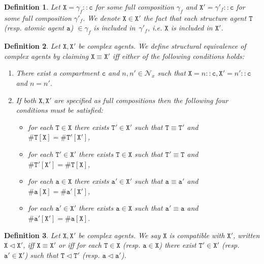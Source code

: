 \documentclass[12pt]{article}
\newtheorem{mydef}{Definition}
\begin{document}
\begin{mydef}
Let $\mathtt{X}=\gamma_f::\mathtt{c}$ for some full composition $\gamma_f$ and $\mathtt{X}'=\gamma'_f::\mathtt{c}$ for some full composition $\gamma'_f$. We denote $\mathtt{X} \in \mathtt{X}'$ the fact that each structure agent $\mathtt{T}$ (resp. atomic agent $\mathtt{a}$) $\in \gamma_f$ is included in~$\gamma'_f$, i.e. $\mathtt{X}$ is included in $\mathtt{X}'$.
\end{mydef}

\begin{mydef}
Let $\mathtt{X},\mathtt{X}'$ be complex agents. We define \emph{structural equivalence} of \emph{complex agents} by claiming $\mathtt{X}\equiv\mathtt{X}'$ iff either of the following conditions holds:
\begin{enumerate}
\item There exist a compartment $\mathtt{c}$ and $n,n'\in\mathcal{N}_x$ such that $\mathtt{X}=n::\mathtt{c},\mathtt{X}'=n'::\mathtt{c}$ and $n=n'$.
\item If both $\mathtt{X},\mathtt{X}'$ are specified as full compositions then the following four conditions must be satisfied:

\begin{itemize}
\item for each $\mathtt{T}\in\mathtt{X}$ there exists $\mathtt{T}'\in\mathtt{X}'$ such that  $\mathtt{T}\equiv\mathtt{T}'$ and $\#\mathtt{T}[\mathtt{X}]=\#\mathtt{T}'[\mathtt{X}']$,
\item for each $\mathtt{T}'\in\mathtt{X}'$ there exists $\mathtt{T}\in\mathtt{X}$ such that  $\mathtt{T}'\equiv\mathtt{T}$ and $\#\mathtt{T}'[\mathtt{X}']=\#\mathtt{T}[\mathtt{X}]$,
\item for each $\mathtt{a}\in\mathtt{X}$ there exists $\mathtt{a}'\in\mathtt{X}'$ such that  $\mathtt{a}\equiv\mathtt{a}'$ and $\#\mathtt{a}[\mathtt{X}]=\#\mathtt{a}'[\mathtt{X}']$,
\item for each $\mathtt{a}'\in\mathtt{X}'$ there exists $\mathtt{a}\in\mathtt{X}$ such that  $\mathtt{a}'\equiv\mathtt{a}$ and $\#\mathtt{a}'[\mathtt{X}']=\#\mathtt{a}[\mathtt{X}]$.
\end{itemize}
\end{enumerate}
\end{mydef}

\begin{mydef}
Let $\mathtt{X},\mathtt{X}'$ be complex agents. We say $\mathtt{X}$ \emph{is compatible} with $\mathtt{X}'$, written $\mathtt{X} \lhd \mathtt{X}'$, iff $\mathtt{X} \equiv \mathtt{X}'$ or iff for each $\mathtt{T} \in \mathtt{X}$ (resp. $\mathtt{a} \in \mathtt{X}$)  there exist $\mathtt{T}' \in \mathtt{X}'$ (resp. $\mathtt{a}' \in \mathtt{X}'$) such that $\mathtt{T} \lhd \mathtt{T}'$ (resp. $\mathtt{a} \lhd \mathtt{a}'$).
\end{mydef}
\end{document}
